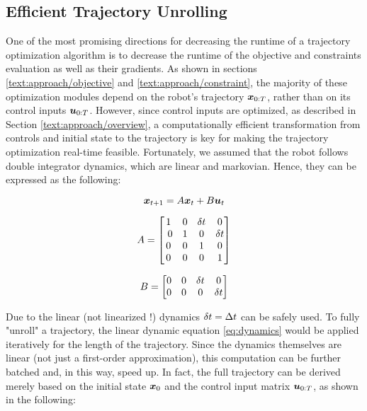 \subsection{Efficient Trajectory Unrolling}
\label{text:approach/runtime/unrolling}
One of the most promising directions for decreasing the runtime of a trajectory optimization algorithm is to decrease the runtime of the objective and constraints evaluation as well as their gradients. As shown in sections \ref{text:approach/objective} and \ref{text:approach/constraint}, the majority of these optimization modules depend on the robot's trajectory $\boldsymbol{x}_{0:T}$, rather than on its control inputs $\boldsymbol{u}_{0:T}$. However, since control inputs are optimized, as described in Section \ref{text:approach/overview}, a computationally efficient transformation from controls and initial state to the trajectory is key for making the trajectory optimization real-time feasible.
\newline
Fortunately, we assumed that the robot follows double integrator dynamics, which are linear and markovian. Hence, they can be expressed as the following: 

\begin{equation}
\boldsymbol{x}_{t+1} = A \boldsymbol{x}_t + B \boldsymbol{u}_t
\label{eq:dynamics}
\end{equation}

\begin{minipage}{0.5\textwidth}
$$A = \begin{bmatrix} 1 & 0 & \dt & 0 \\ 0 & 1 & 0 & \dt \\ 0 & 0 & 1 & 0 \\ 0 & 0 & 0 & 1\end{bmatrix}$$
\end{minipage}
\begin{minipage}{0.5\textwidth}
$$B = \begin{bmatrix} 0 & 0 & \delta t & 0 \\ 0 & 0 & 0 & \delta t \end{bmatrix}$$
\end{minipage}

Due to the linear (not linearized !) dynamics $\delta t = \Delta t$ can be safely used. To fully "unroll" a trajectory, the linear dynamic equation \ref{eq:dynamics} would be applied iteratively for the length of the trajectory. Since the dynamics themselves are linear (not just a first-order approximation), this computation can be further batched and, in this way, speed up. In fact, the full trajectory can be derived merely based on the initial state $\boldsymbol{x}_0$ and the control input matrix $\boldsymbol{u}_{0:T}$, as shown in the following:


